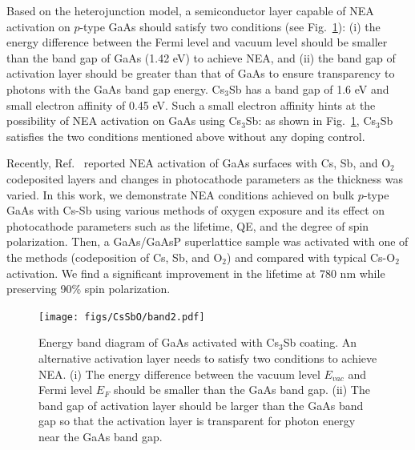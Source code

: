 

Based on the heterojunction model, a semiconductor layer capable of NEA activation on $p$-type GaAs should satisfy two conditions (see Fig.~\ref{fig_band}): (i) the energy difference between the Fermi level and vacuum level should be smaller than the band gap of GaAs (1.42 eV) to achieve NEA, and (ii) the band gap of activation layer should be greater than that of GaAs to ensure transparency to photons with the GaAs band gap energy.
Cs$_3$Sb has a band gap of 1.6 eV and small electron affinity of 0.45 eV.
Such a small electron affinity hints at the possibility of NEA activation on GaAs using Cs$_3$Sb: as shown in Fig.~\ref{fig_band}, Cs$_3$Sb satisfies the two conditions mentioned above without any doping control. %

Recently, Ref.~\cite{cultrera2020_LongLifetimePolarized} reported NEA activation of GaAs surfaces with Cs, Sb, and O$_2$ codeposited layers and changes in photocathode parameters as the thickness was varied.
In this work, we demonstrate NEA conditions achieved on bulk $p$-type GaAs with Cs-Sb using various methods of oxygen exposure and its effect on photocathode parameters such as the lifetime, QE, and the degree of spin polarization.
Then, a GaAs/GaAsP superlattice sample was activated with one of the methods (codeposition of Cs, Sb, and O$_2$) and compared with typical Cs-O$_2$ activation. We find a significant improvement in the lifetime at 780 nm while preserving 90\% spin polarization.





\begin{figure}
	\centering
	\texttt{[image: figs/CsSbO/band2.pdf]}
	\caption{Energy band diagram of GaAs activated with Cs$_3$Sb coating. An alternative activation layer needs to satisfy two conditions to achieve NEA. (i) The energy difference between the vacuum level $E_{vac}$ and Fermi level $E_F$ should be smaller than the GaAs band gap. (ii) The band gap of activation layer should be larger than the GaAs band gap so that the activation layer is transparent for photon energy near the GaAs band gap.}
	\label{fig_band}
\end{figure}

